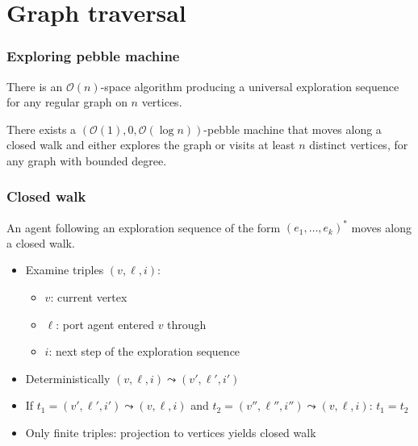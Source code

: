 \documentclass{beamer}
\begin{document}
\section{Graph traversal}
\begin{frame}
  \frametitle{Exploring pebble machine}
  \begin{theorem}[Reingold]
    There is an $\mathcal{O}(n)$-space algorithm producing a universal
    exploration sequence for any regular graph on $n$ vertices.
  \end{theorem}
  \begin{center}
  \end{center}
  \begin{theorem}
    There exists a $(\mathcal{O}(1), 0, \mathcal{O}(\log n))$-pebble machine
    that moves along a closed walk and either explores the graph or visits at
    least $n$ distinct vertices, for any graph with bounded degree.
  \end{theorem}
\end{frame}
\begin{frame}
  \frametitle{Closed walk}
  \begin{lemma}
    An agent following an exploration sequence of the form
    $(e_{1},\dots,e_{k})^{\ast}$ moves along a closed walk.
  \end{lemma}
  \begin{itemize}
    \item Examine triples $(v,\ell,i)$:
      \begin{itemize}
        \item $v$: current vertex
        \item $\ell$: port agent entered $v$ through
        \item $i$: next step of the exploration sequence
      \end{itemize}
    \item Deterministically $(v,\ell,i) \leadsto (v',\ell',i')$
    \item If $t_{1} = (v',\ell',i') \leadsto (v,\ell,i)$ and
      $t_{2} = (v'',\ell'',i'') \leadsto (v,\ell,i)$: $t_{1} = t_{2}$
    \item Only finite triples: projection to vertices yields closed walk
  \end{itemize}
\end{frame}
\end{document}
